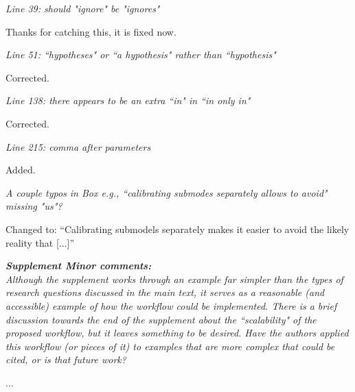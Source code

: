 \documentclass[11pt,letter]{article}
\begin{document}
\begin{mybox}
\emph{Line 39: should "ignore" be "ignores"}
\end{mybox}

Thanks for catching this, it is fixed now. 

\begin{mybox}
\emph{Line 51: ``hypotheses" or ``a hypothesis" rather than ``hypothesis"}
\end{mybox}

Corrected.

\begin{mybox}
\emph{Line 138: there appears to be an extra ``in" in ``in only in"}
\end{mybox}

Corrected.

\begin{mybox}
\emph{Line 215: comma after parameters}
\end{mybox}

Added.

\begin{mybox}
\emph{A couple typos in Box e.g., ``calibrating submodes separately allows to
avoid" missing "us"?}
\end{mybox}

Changed to: ``Calibrating submodels separately makes it easier to avoid the likely reality that [...]''

\begin{mybox}
\emph{\textbf{Supplement Minor comments:}\\
Although the supplement works through an example far simpler than the
types of research questions discussed in the main text, it serves as a
reasonable (and accessible) example of how the workflow could be
implemented. There is a brief discussion towards the end of the
supplement about the ``scalability" of the proposed workflow, but it
leaves something to be desired. Have the authors applied this workflow
(or pieces of it) to examples that are more complex that could be cited,
or is that future work?}
\end{mybox}

... %
\end{document}
